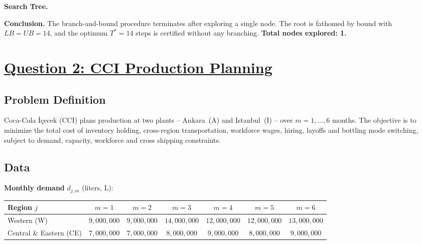 \documentclass[12pt,a4paper]{article}
\begin{document}
\medskip
\textbf{Search Tree.}

\begin{center}
\end{center}

\textbf{Conclusion.}
The branch-and-bound procedure terminates after exploring a single node. The root is
fathomed by bound with $LB=UB=14$, and the optimum $T^*=14$ steps is certified without
any branching. \textbf{Total nodes explored: 1.}

\section*{\underline{Question 2: CCI Production Planning}}

\subsection*{Problem Definition}

Coca-Cola \.{I}\c{c}ecek (CCI) plans production at two plants -- Ankara~(A) and
Istanbul~(I) -- over $m=1,\ldots,6$ months. The objective is to minimize the total cost of
inventory holding, cross-region transportation, workforce wages, hiring, layoffs and
bottling mode switching, subject to demand, capacity, workforce and cross shipping
constraints.

\subsection*{Data}

\textbf{Monthly demand} $d_{j,m}$ (liters, L):

\begin{center}
\begin{tabular}{lcccccc}
\toprule
Region $j$ & $m=1$ & $m=2$ & $m=3$ & $m=4$ & $m=5$ & $m=6$ \\
\midrule
Western (W)             & $9{,}000{,}000$ & $9{,}000{,}000$ & $14{,}000{,}000$ & $12{,}000{,}000$ & $12{,}000{,}000$ & $13{,}000{,}000$ \\
Central \& Eastern (CE) & $7{,}000{,}000$ & $7{,}000{,}000$ & $8{,}000{,}000$ & $9{,}000{,}000$ & $8{,}000{,}000$ & $9{,}000{,}000$ \\
\bottomrule
\end{tabular}
\end{center}
\end{document}
